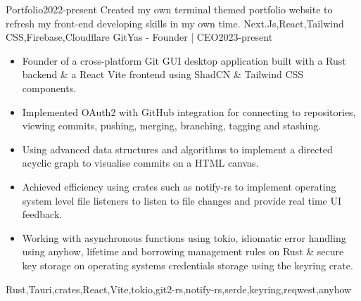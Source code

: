 
\begin{projects}
    \project
	{Portfolio}{2022-present}
	{}
	{Created my own terminal themed portfolio website to refresh my front-end developing skills in my own time.}
	{Next.Js,React,Tailwind CSS,Firebase,Cloudflare}
    \project
    {GitYas - Founder | CEO}{2023-present}
	{
	  \begin{itemize}
		\item Founder of a cross-platform Git GUI desktop application built with a Rust backend \& a React Vite frontend using ShadCN \& Tailwind CSS components.
		\item Implemented OAuth2 with GitHub integration for connecting to repositories, viewing commits, pushing, merging, branching, tagging and stashing.
		\item Using advanced data structures and algorithms to implement a directed acyclic graph to visualise commits on a HTML canvas.
		\item Achieved efficiency using crates such as notify-rs to implement operating system level file listeners to listen to file changes and provide real time UI feedback.
		\item Working with asynchronous functions using tokio, idiomatic error handling using anyhow, lifetime and borrowing management rules on Rust \& secure key storage on operating systems credentials storage using the keyring crate.
	  \end{itemize}
	}
	{Rust,Tauri,crates,React,Vite,tokio,git2-rs,notify-rs,serde,keyring,reqwest,anyhow}
\end{projects}